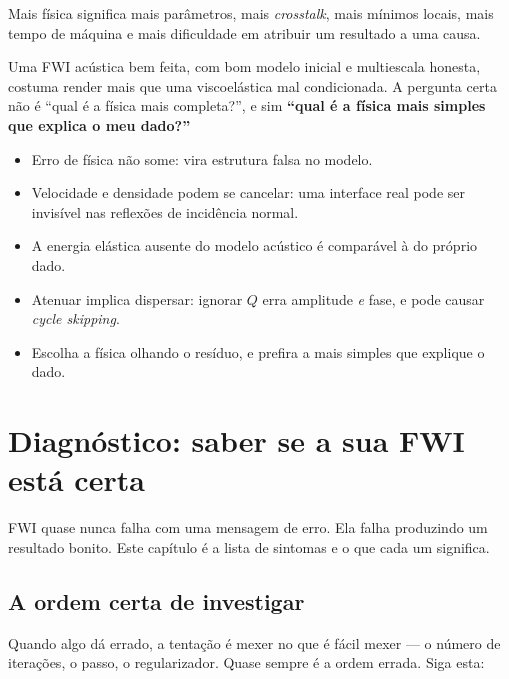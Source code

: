 \documentclass[11pt,a4paper,oneside]{report}
\begin{document}
\begin{armadilha}
Mais f\'isica significa mais par\^ametros, mais \emph{crosstalk}, mais
m\'inimos locais, mais tempo de m\'aquina e mais dificuldade em atribuir um
resultado a uma causa.

Uma FWI ac\'ustica bem feita, com bom modelo inicial e multiescala honesta,
costuma render mais que uma viscoel\'astica mal condicionada. A pergunta certa
n\~ao \'e ``qual \'e a f\'isica mais completa?'', e sim \textbf{``qual \'e a
f\'isica mais simples que explica o meu dado?''}
\end{armadilha}

\begin{resumo}
\begin{itemize}[leftmargin=*, itemsep=1pt]
\item Erro de f\'isica n\~ao some: vira estrutura falsa no modelo.
\item Velocidade e densidade podem se cancelar: uma interface real pode ser
invis\'ivel nas reflex\~oes de incid\^encia normal.
\item A energia el\'astica ausente do modelo ac\'ustico \'e compar\'avel \`a
do pr\'oprio dado.
\item Atenuar implica dispersar: ignorar $Q$ erra amplitude \emph{e} fase, e
pode causar \emph{cycle skipping}.
\item Escolha a f\'isica olhando o res\'iduo, e prefira a mais simples que
explique o dado.
\end{itemize}
\end{resumo}

\chapter{Diagn\'ostico: saber se a sua FWI est\'a certa}
\label{cap:diagnostico}

\begin{ideia}
FWI quase nunca falha com uma mensagem de erro. Ela falha produzindo um
resultado bonito. Este cap\'itulo \'e a lista de sintomas e o que cada um
significa.
\end{ideia}

\section{A ordem certa de investigar}

Quando algo d\'a errado, a tenta\c{c}\~ao \'e mexer no que \'e f\'acil mexer
--- o n\'umero de itera\c{c}\~oes, o passo, o regularizador. Quase sempre \'e
a ordem errada. Siga esta:
\end{document}
